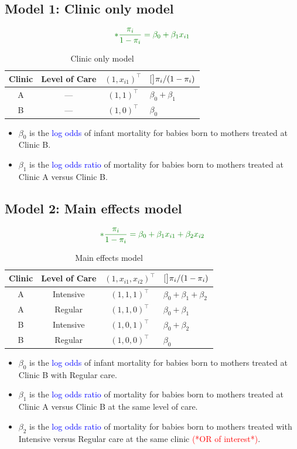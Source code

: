 \documentclass[oneside]{book}\usepackage[]{graphicx}\usepackage[svgnames]{xcolor}
\let\log\relax%
\begin{document}
\subsection*{Model 1: Clinic only model}
\[ \textcolor{Green}{\log*{\frac{\pi_i}{1-\pi_i}}=\beta_0+\beta_1x_{i1}} \]
\begin{table}[!htbp]
      \centering
      \begin{NiceTabular}{cccl}
            Clinic & Level of Care & $ (1,x_{i1})^\top $ & $ \log[\big]{\pi_i/(1-\pi_i)} $\\
            \midrule
            A & --- & $ (1,1)^\top $ & $ \beta_0+\beta_1 $\\
            B & --- & $ (1,0)^\top $ & $ \beta_0 $
      \end{NiceTabular}
      \caption{Clinic only model}
\end{table}
\begin{itemize}
      \item $ \beta_0 $ is the \textcolor{Blue}{log odds} of infant mortality for babies born to mothers treated at Clinic B.
      \item $ \beta_1 $ is the \textcolor{Blue}{log odds ratio} of mortality for babies born to mothers treated at Clinic A
            versus Clinic B.
\end{itemize}
\subsection*{Model 2: Main effects model}
\[ \textcolor{Green}{\log*{\frac{\pi_i}{1-\pi_i}}=\beta_0+\beta_1x_{i1}+\beta_2x_{i2}} \]
\begin{table}[!htbp]
      \centering
      \begin{NiceTabular}{cccl}
            Clinic & Level of Care & $ (1,x_{i1},x_{i2})^\top $ & $ \log[\big]{\pi_i/(1-\pi_i)} $\\
            \midrule
            A & Intensive & $ (1,1,1)^\top $ & $ \beta_0+\beta_1+\beta_2 $\\
            A & Regular & $ (1,1,0)^\top $ & $ \beta_0+\beta_1 $\\
            B & Intensive & $ (1,0,1)^\top $ & $ \beta_0+\beta_2 $\\
            B & Regular & $ (1,0,0)^\top $ & $ \beta_0 $
      \end{NiceTabular}
      \caption{Main effects model}
\end{table}
\begin{itemize}
      \item $ \beta_0 $ is the \textcolor{Blue}{log odds} of infant mortality for babies born to mothers treated at Clinic
            B with Regular care.
      \item $ \beta_1 $ is the \textcolor{Blue}{log odds ratio} of mortality for babies born to mothers treated at Clinic A
            versus Clinic B at the same level of care.
      \item $ \beta_2 $ is the \textcolor{Blue}{log odds ratio} of mortality for babies born to mothers treated with
            Intensive versus Regular care at the same clinic \textcolor{Red}{(*OR of interest*)}.
\end{itemize}
\end{document}
